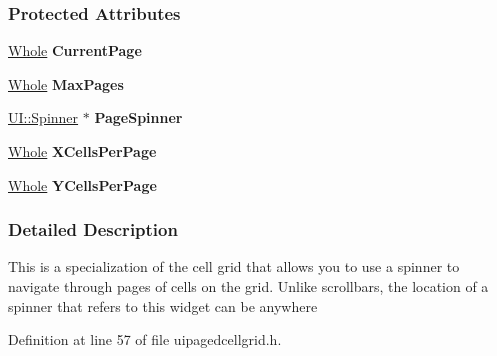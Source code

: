 \subsubsection*{Protected Attributes}
\begin{DoxyCompactItemize}
\item 
\hypertarget{classMezzanine_1_1UI_1_1PagedCellGrid_a40f0c33a1833836041e58973f14fcaf1}{
\hyperlink{namespaceMezzanine_adcbb6ce6d1eb4379d109e51171e2e493}{Whole} {\bfseries CurrentPage}}
\label{classMezzanine_1_1UI_1_1PagedCellGrid_a40f0c33a1833836041e58973f14fcaf1}

\item 
\hypertarget{classMezzanine_1_1UI_1_1PagedCellGrid_ab82907ff74c468fb82eae9567f72aec5}{
\hyperlink{namespaceMezzanine_adcbb6ce6d1eb4379d109e51171e2e493}{Whole} {\bfseries MaxPages}}
\label{classMezzanine_1_1UI_1_1PagedCellGrid_ab82907ff74c468fb82eae9567f72aec5}

\item 
\hypertarget{classMezzanine_1_1UI_1_1PagedCellGrid_ab9d77a0431ed263599778fc2f8e036ee}{
\hyperlink{classMezzanine_1_1UI_1_1Spinner}{UI::Spinner} $\ast$ {\bfseries PageSpinner}}
\label{classMezzanine_1_1UI_1_1PagedCellGrid_ab9d77a0431ed263599778fc2f8e036ee}

\item 
\hypertarget{classMezzanine_1_1UI_1_1PagedCellGrid_ae8bb0ce9e234195fac3de9668fd2e1a8}{
\hyperlink{namespaceMezzanine_adcbb6ce6d1eb4379d109e51171e2e493}{Whole} {\bfseries XCellsPerPage}}
\label{classMezzanine_1_1UI_1_1PagedCellGrid_ae8bb0ce9e234195fac3de9668fd2e1a8}

\item 
\hypertarget{classMezzanine_1_1UI_1_1PagedCellGrid_accc431f0479bf16764c73d1f1cff8c85}{
\hyperlink{namespaceMezzanine_adcbb6ce6d1eb4379d109e51171e2e493}{Whole} {\bfseries YCellsPerPage}}
\label{classMezzanine_1_1UI_1_1PagedCellGrid_accc431f0479bf16764c73d1f1cff8c85}

\end{DoxyCompactItemize}


\subsubsection{Detailed Description}
This is a specialization of the cell grid that allows you to use a spinner to navigate through pages of cells on the grid. Unlike scrollbars, the location of a spinner that refers to this widget can be anywhere 

Definition at line 57 of file uipagedcellgrid.h.



